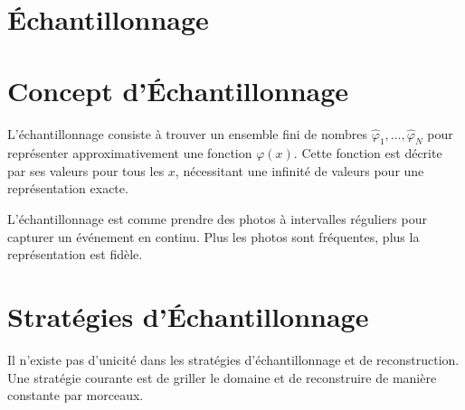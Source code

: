 \documentclass[12pt]{article}
\begin{document}
\newpage

\section{Échantillonnage}

\sub\section{Concept d'Échantillonnage}

L'échantillonnage consiste à trouver un ensemble fini de nombres \(\hat{\varphi}_1, \ldots, \hat{\varphi}_N\) pour représenter approximativement une fonction \(\varphi(x)\). Cette fonction est décrite par ses valeurs pour tous les \(x\), nécessitant une infinité de valeurs pour une représentation exacte.

\begin{tcolorbox}[title={Intuition}]
L'échantillonnage est comme prendre des photos à intervalles réguliers pour capturer un événement en continu. Plus les photos sont fréquentes, plus la représentation est fidèle.
\end{tcolorbox}


\sub\section{Stratégies d'Échantillonnage}

Il n'existe pas d'unicité dans les stratégies d'échantillonnage et de reconstruction. Une stratégie courante est de griller le domaine et de reconstruire de manière constante par morceaux.


\end{document}
